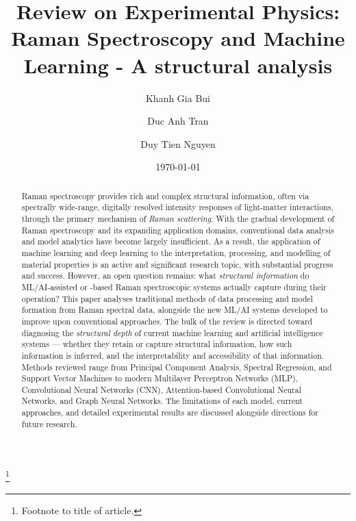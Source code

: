 \documentclass[%
 aip,
 jmp,%
 amsmath,amssymb,
 reprint,%
]{revtex4-2}
\begin{document}

\title[Raman Spectroscopy]{Review on Experimental Physics:\\Raman Spectroscopy and Machine Learning - A structural analysis}%
\thanks{Footnote to title of article.}

\author{Khanh Gia Bui}
\author{Duc Anh Tran}%
\author{Duy Tien Nguyen}%
%


\date{\today}%

\begin{abstract}
Raman spectroscopy provides rich and complex structural information, often via spectrally wide-range, digitally resolved intensity responses of light-matter interactions, through the primary mechanism of \textit{Raman scattering}. With the gradual development of Raman spectroscopy and its expanding application domains, conventional data analysis and model analytics have become largely insufficient. As a result, the application of machine learning and deep learning to the interpretation, processing, and modelling of material properties is an active and significant research topic, with substantial progress and success. However, an open question remains: what \textit{structural information} do ML/AI-assisted or -based Raman spectroscopic systems actually capture during their operation? This paper analyses traditional methods of data processing and model formation from Raman spectral data, alongside the new ML/AI systems developed to improve upon conventional approaches. The bulk of the review is directed toward diagnosing the \textit{structural depth} of current machine learning and artificial intelligence systems --- whether they retain or capture structural information, how such information is inferred, and the interpretability and accessibility of that information. Methods reviewed range from Principal Component Analysis, Spectral Regression, and Support Vector Machines to modern Multilayer Perceptron Networks (MLP), Convolutional Neural Networks (CNN), Attention-based Convolutional Neural Networks, and Graph Neural Networks. The limitations of each model, current approaches, and detailed experimental results are discussed alongside directions for future research.%
\end{abstract}
\end{document}
